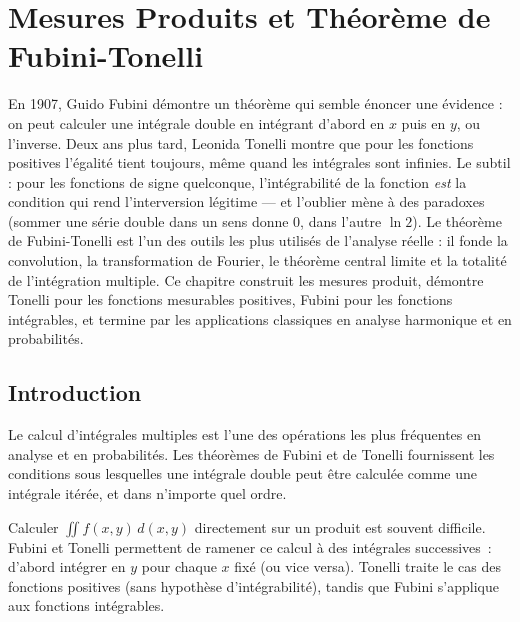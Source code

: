 \chapter{Mesures Produits et Th\'eor\`eme de Fubini-Tonelli}
\label{ch:fubini}

En 1907, Guido Fubini démontre un théorème qui semble énoncer une évidence : on peut calculer une intégrale double en intégrant d'abord en $x$ puis en $y$, ou l'inverse. Deux ans plus tard, Leonida Tonelli montre que pour les fonctions positives l'égalité tient toujours, même quand les intégrales sont infinies. Le subtil : pour les fonctions de signe quelconque, l'intégrabilité de la fonction \emph{est} la condition qui rend l'interversion légitime --- et l'oublier mène à des paradoxes (sommer une série double dans un sens donne $0$, dans l'autre $\ln 2$). Le théorème de Fubini-Tonelli est l'un des outils les plus utilisés de l'analyse réelle : il fonde la convolution, la transformation de Fourier, le théorème central limite et la totalité de l'intégration multiple. Ce chapitre construit les mesures produit, démontre Tonelli pour les fonctions mesurables positives, Fubini pour les fonctions intégrables, et termine par les applications classiques en analyse harmonique et en probabilités.

\section{Introduction}

Le calcul d'int\'egrales multiples est l'une des op\'erations les plus fr\'equentes
en analyse et en probabilit\'es. Les th\'eor\`emes de Fubini et de Tonelli fournissent
les conditions sous lesquelles une int\'egrale double peut \^etre calcul\'ee comme
une int\'egrale it\'er\'ee, et dans n'importe quel ordre.

\begin{intuition}[title=\textbf{Pourquoi Fubini-Tonelli~?}]
Calculer $\iint f(x,y)\, d(x,y)$ directement sur un produit est souvent difficile.
Fubini et Tonelli permettent de ramener ce calcul \`a des int\'egrales
successives~: d'abord int\'egrer en $y$ pour chaque $x$ fix\'e (ou vice versa).
Tonelli traite le cas des fonctions positives (sans hypoth\`ese d'int\'egrabilit\'e),
tandis que Fubini s'applique aux fonctions int\'egrables.
\end{intuition}

